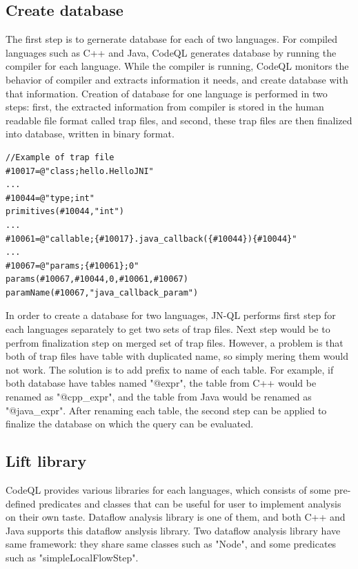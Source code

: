 \subsection{Create database}
The first step is to gernerate database for each of two languages.  For
compiled languages such as C++ and Java, CodeQL generates database by running
the compiler for each language. While the compiler is running, CodeQL monitors
the behavior of compiler and extracts information it needs, and create database
with that information.  Creation of database for one language is performed in
two steps: first, the extracted information from compiler is stored in the
human readable file format called trap files, and second, these trap files are
then finalized into database, written in binary format.

\begin{lstlisting}[style=java,numbers=none,xleftmargin=2.5em]
//Example of trap file
#10017=@"class;hello.HelloJNI"
...
#10044=@"type;int"
primitives(#10044,"int")
...
#10061=@"callable;{#10017}.java_callback({#10044}){#10044}"
...
#10067=@"params;{#10061};0"
params(#10067,#10044,0,#10061,#10067)
paramName(#10067,"java_callback_param")
\end{lstlisting}

In order to create a database for two languages, JN-QL performs first step for
each languages separately to get two sets of trap files.  Next step would be to
perfrom finalization step on merged set of trap files. However, a problem is that
both of trap files have table with duplicated name, so simply mering them would not work.
The solution is to add prefix to name of each table. For example, if both
database have tables named "@expr", the table from C++ would be renamed as
"@cpp\_expr", and the table from Java would be renamed as "@java\_expr". After
renaming each table, the second step can be applied to finalize the database on
which the query can be evaluated.

\subsection{Lift library}
CodeQL provides various libraries for each languages, which consists of some
pre-defined predicates and classes that can be useful for user to implement
analysis on their own taste. Dataflow analysis library is one of them, and both
C++ and Java supports this dataflow anslysis library. Two dataflow analysis
library have same framework: they share same classes such as "Node", and some
predicates such as "simpleLocalFlowStep".

